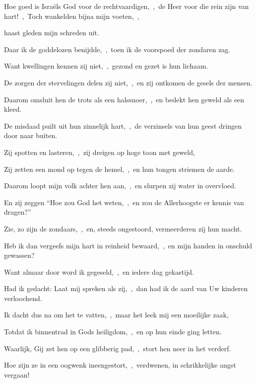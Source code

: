 \documentclass[12pt,twoside,a5paper]{article}
\begin{document}
\begin{halfparskip}

   Hoe goed is Israëls God voor de rechtvaardigen,~\sep\ de Heer voor die rein zijn van hart!~\sep\ Toch wankelden bijna mijn voeten,~\sep


  haast gleden mijn schreden uit.

  Daar ik de goddelozen benijdde,~\sep\ toen ik de voorspoed der zondaren zag.

  Want kwellingen kennen zij niet,~\sep\ gezond en gezet is hun lichaam.

  De zorgen der stervelingen delen zij niet,~\sep\ en zij ontkomen de gesels der mensen.

  Daarom omsluit hen de trots als een halssnoer,~\sep\ en bedekt hen geweld als een kleed.

  De misdaad puilt uit hun zinnelijk hart,~\sep\ de verzinsels van hun geest dringen door naar buiten.

  Zij spotten en lasteren,~\sep\ zij dreigen op hoge toon met geweld,

  Zij zetten een mond op tegen de hemel,~\sep\ en hun tongen striemen de aarde.

  Daarom loopt mijn volk achter hen aan,~\sep\ en slurpen zij water in overvloed.

  En zij zeggen ``Hoe zou God het weten,~\sep\ en zou de Allerhoogste er kennis van dragen?''

  Zie, zo zijn de zondaars,~\sep\ en, steeds ongestoord, vermeerderen zij hun macht.

  Heb ik dan vergeefs mijn hart in reinheid bewaard,~\sep\ en mijn handen in onschuld gewassen?

  Want almaar door word ik gegeseld,~\sep\ en iedere dag gekastijd.

  Had ik gedacht: Laat mij spreken als zij,~\sep\ dan had ik de aard van Uw kinderen verloochend.

  Ik dacht dus na om het te vatten,~\sep\ maar het leek mij een moeilijke zaak,

  Totdat ik binnentrad in Gods heiligdom,~\sep\ en op hun einde ging letten.

  Waarlijk, Gij zet hen op een glibberig pad,~\sep\ stort hen neer in het verderf.

  Hoe zijn ze in een oogwenk ineengestort,~\sep\ verdwenen, in schrikkelijke angst vergaan!


\end{halfparskip}
\end{document}

